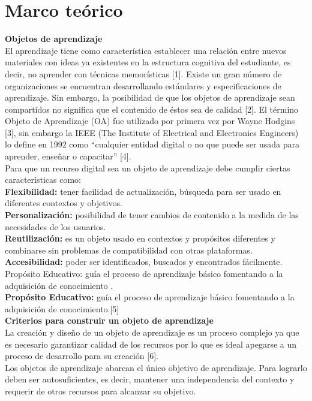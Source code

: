 \documentclass{llncs}
\begin{document}
\section{Marco teórico}
\textbf{Objetos de aprendizaje} \\
El aprendizaje tiene como característica establecer una relación entre nuevos materiales con ideas ya existentes en la estructura cognitiva del estudiante, es decir,  no aprender con técnicas memorísticas [1]. Existe un gran número de organizaciones se encuentran desarrollando estándares y especificaciones de aprendizaje. Sin embargo, la posibilidad de que los objetos de aprendizaje sean compartidos no significa que el contenido de éstos sea de calidad [2].
El término Objeto de Aprendizaje (OA) fue utilizado por primera vez por Wayne Hodgins [3], sin embargo la IEEE (The Institute of Electrical and Electronics Engineers) lo define en 1992 como “cualquier entidad digital o no que puede ser usada para aprender, enseñar o capacitar” [4].\\
Para que un recurso digital  sea un objeto de aprendizaje debe cumplir ciertas características como:\\
\textbf{Flexibilidad:} tener facilidad de actualización, búsqueda para ser usado en diferentes contextos y objetivos.\\
\textbf{Personalización:} posibilidad de tener cambios de contenido a la medida de las necesidades de los usuarios.\\
\textbf{Reutilización:} es un objeto usado en contextos y propósitos diferentes y combinarse sin problemas de compatibilidad con otras plataformas.\\
\textbf{Accesibilidad:} poder ser identificados, buscados y encontrados fácilmente.
Propósito Educativo: guía el proceso de aprendizaje básico fomentando a la adquisición de conocimiento .\\
\textbf{Propósito Educativo:} guía el proceso de aprendizaje básico fomentando a la adquisición de conocimiento.[5]\\
\textbf{Criterios para construir un objeto de aprendizaje} \\
La creación y diseño de un objeto de aprendizaje es un proceso complejo ya que es necesario garantizar calidad de los recursos por lo que es ideal apegarse a un proceso de desarrollo para su creación [6].\\
Los objetos de aprendizaje abarcan el único objetivo de aprendizaje. Para lograrlo deben ser autosuficientes, es decir, mantener una independencia del contexto y requerir de otros recursos para alcanzar su objetivo.
\end{document}
